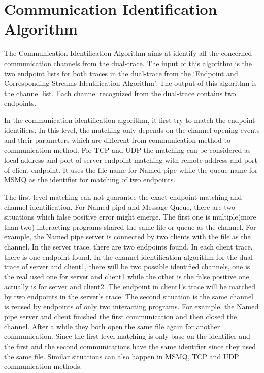 \section{Communication Identification Algorithm}
The Communication Identification Algorithm aims at identify all the concerned communication channels from the dual-trace. The input of this algorithm is the two endpoint lists for both traces in the dual-trace from the `Endpoint and Corresponding Streams Identification Algorithm'. The output of this algorithm is the channel list. Each channel recognized from the dual-trace contains two endpoints. 

In the communication identification algorithm, it first try to match the endpoint identifiers. In this level, the matching only depends on the channel opening events and their parameters which are different from communication method to communication method. For TCP and UDP the matching can be considered as local address and port of server endpoint matching with remote address and port of client endpoint. It uses the file name for Named pipe while the queue name for MSMQ as the identifier for matching of two endpoints. 

The first level matching can not guarantee the exact endpoint matching and channel identification. For Named pipd and Message Queue, there are two situations which false positive error might emerge. The first one is multiple(more than two) interacting programs shared the same file or queue as the channel. For example, the Named pipe server is connected by two clients with the file as the channel. In the server trace, there are two endpoints found. In each client trace, there is one endpoint found. In the channel identification algorithm for the dual-trace of server and client1, there will be two possible identified channels, one is the real used one for server and client1 while the other is the false positive one actually is for server and client2. The endpoint in client1's trace will be matched by two endpoints in the server's trace. The second situation is the same channel is reused by endpoints of only two interacting programs. For example, the Named pipe server and client finished the first communication and then closed the channel. After a while they both open the same file again for another communication. Since the first level matching is only base on the identifier and the first and the second communications have the same identifier since they used the same file. Similar situations can also happen in MSMQ, TCP and UDP communication methods. 

